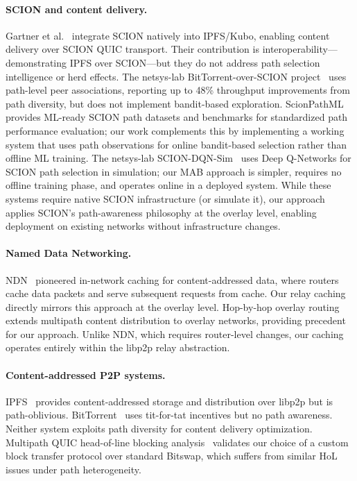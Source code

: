 \documentclass[sigconf,nonacm]{acmart}
\begin{document}
\paragraph{SCION and content delivery.} Gartner et al.~\cite{gartner2025ipfs} integrate SCION natively into IPFS/Kubo, enabling content delivery over SCION QUIC transport. Their contribution is interoperability---demonstrating IPFS over SCION---but they do not address path selection intelligence or herd effects. The netsys-lab BitTorrent-over-SCION project~\cite{btscion2023} uses path-level peer associations, reporting up to 48\% throughput improvements from path diversity, but does not implement bandit-based exploration. ScionPathML~\cite{scionpathml2025} provides ML-ready SCION path datasets and benchmarks for standardized path performance evaluation; our work complements this by implementing a working system that uses path observations for online bandit-based selection rather than offline ML training. The netsys-lab SCION-DQN-Sim~\cite{sciondqnsim2025} uses Deep Q-Networks for SCION path selection in simulation; our MAB approach is simpler, requires no offline training phase, and operates online in a deployed system. While these systems require native SCION infrastructure (or simulate it), our approach applies SCION's path-awareness philosophy at the overlay level, enabling deployment on existing networks without infrastructure changes.

\paragraph{Named Data Networking.} NDN~\cite{jacobson2009networking,zhang2014ndn} pioneered in-network caching for content-addressed data, where routers cache data packets and serve subsequent requests from cache. Our relay caching directly mirrors this approach at the overlay level. Hop-by-hop overlay routing~\cite{hopoverlay2025} extends multipath content distribution to overlay networks, providing precedent for our approach. Unlike NDN, which requires router-level changes, our caching operates entirely within the libp2p relay abstraction.

\paragraph{Content-addressed P2P systems.} IPFS~\cite{benet2014ipfs} provides content-addressed storage and distribution over libp2p but is path-oblivious. BitTorrent~\cite{cohen2003incentives} uses tit-for-tat incentives but no path awareness. Neither system exploits path diversity for content delivery optimization. Multipath QUIC head-of-line blocking analysis~\cite{changpeng2025mpquic} validates our choice of a custom block transfer protocol over standard Bitswap, which suffers from similar HoL issues under path heterogeneity.
\end{document}
